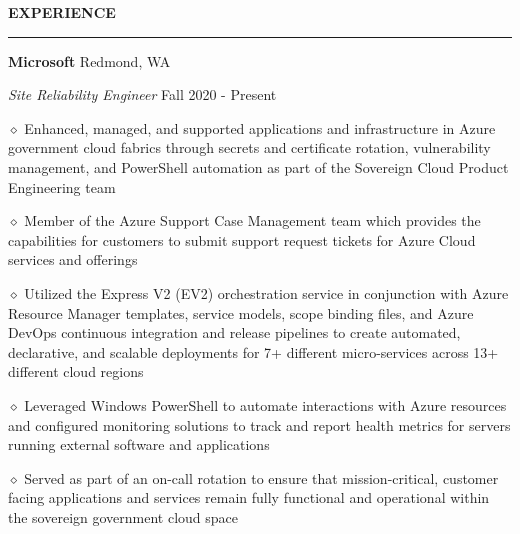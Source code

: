 \documentclass[executivepaper]{extarticle}
\begin{document}
\begin{center}
{\begin{minipage}{7.0in}
{\noindent \textbf{\fontsize{12}{9}\selectfont EXPERIENCE}}

\vspace{-3mm}

\noindent \rule{\textwidth}{0.5pt}

\vspace{0.5mm}

{\noindent \textbf{\fontsize{12}{8}\selectfont Microsoft}} {\hfill \fontsize{10}{8}\selectfont Redmond, WA}

\vspace{0.5mm}

{\noindent \textit{\fontsize{12}{8}\selectfont Site Reliability Engineer}} {\hfill \fontsize{10}{8}\selectfont Fall 2020 - Present}

\vspace{0.5mm}

{\noindent $\diamond$ {\fontsize{12}{8}\selectfont Enhanced, managed, and supported applications and infrastructure in Azure government cloud fabrics through secrets and certificate rotation, vulnerability management, and PowerShell automation as part of the Sovereign Cloud Product Engineering team}}

\vspace{1mm}

{\noindent $\diamond$ {\fontsize{12}{8}\selectfont Member of the Azure Support Case Management team which provides the capabilities for customers to submit support request tickets for Azure Cloud services and offerings}}

\vspace{1mm}

{\noindent $\diamond$ {\fontsize{12}{8}\selectfont Utilized the Express V2 (EV2) orchestration service in conjunction with Azure Resource Manager templates, service models, scope binding files, and Azure DevOps continuous integration and release pipelines to create automated, declarative, and scalable deployments for 7+ different micro-services across 13+ different cloud regions}}

\vspace{1mm}

{\noindent $\diamond$ {\fontsize{12}{8}\selectfont Leveraged Windows PowerShell to automate interactions with Azure resources and configured monitoring solutions to track and report health metrics for servers running external software and applications}}

\vspace{1mm}

{\noindent $\diamond$ {\fontsize{12}{8}\selectfont Served as part of an on-call rotation to ensure that mission-critical, customer facing applications and services remain fully functional and operational within the sovereign government cloud space}}


\end{minipage}}
\end{center}
\end{document}
